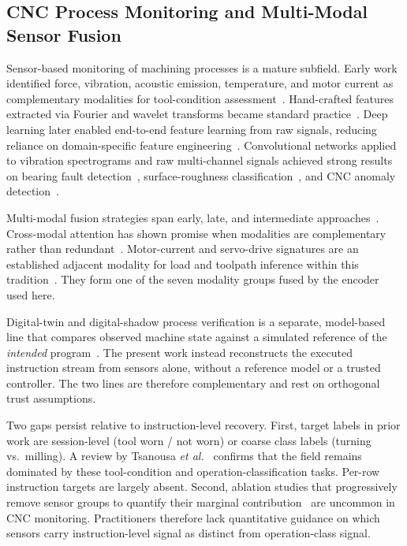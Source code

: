 \documentclass[sensors,article,submit,moreauthors,pdftex]{Definitions/mdpi}
\newcommand{\etal}{\textit{et al.}}
\begin{document}
\subsection{CNC Process Monitoring and Multi-Modal Sensor Fusion}
\label{sec:related-cnc}

Sensor-based monitoring of machining processes is a mature subfield. Early work identified force, vibration, acoustic emission, temperature, and motor current as complementary modalities for tool-condition assessment~\cite{teti2010advanced}. Hand-crafted features extracted via Fourier and wavelet transforms became standard practice~\cite{zhu2009wavelet,mohanraj2020tool}. Deep learning later enabled end-to-end feature learning from raw signals, reducing reliance on domain-specific feature engineering~\cite{wang2018deep,zhao2019machine}. Convolutional networks applied to vibration spectrograms and raw multi-channel signals achieved strong results on bearing fault detection~\cite{janssens2016convolutional}, surface-roughness classification~\cite{bhandari2021comparative,stathatos2024cnn}, and CNC anomaly detection~\cite{coelho2024anomaly}.

Multi-modal fusion strategies span early, late, and intermediate approaches~\cite{lahat2015multimodal,ramachandram2017deep}. Cross-modal attention has shown promise when modalities are complementary rather than redundant~\cite{cao2023crossattention,wang2024multisensor}. Motor-current and servo-drive signatures are an established adjacent modality for load and toolpath inference within this tradition~\cite{teti2010advanced,wang2018deep}. They form one of the seven modality groups fused by the encoder used here.

Digital-twin and digital-shadow process verification is a separate, model-based line that compares observed machine state against a simulated reference of the \emph{intended} program~\cite{bergs2021digital}. The present work instead reconstructs the executed instruction stream from sensors alone, without a reference model or a trusted controller. The two lines are therefore complementary and rest on orthogonal trust assumptions.

Two gaps persist relative to instruction-level recovery. First, target labels in prior work are session-level (tool worn / not worn) or coarse class labels (turning vs.\ milling). A review by Tsanousa \etal~\cite{tsanousa2022multisensor} confirms that the field remains dominated by these tool-condition and operation-classification tasks. Per-row instruction targets are largely absent. Second, ablation studies that progressively remove sensor groups to quantify their marginal contribution~\cite{meyes2019ablation,jia2016deep} are uncommon in CNC monitoring. Practitioners therefore lack quantitative guidance on which sensors carry instruction-level signal as distinct from operation-class signal.
\end{document}
